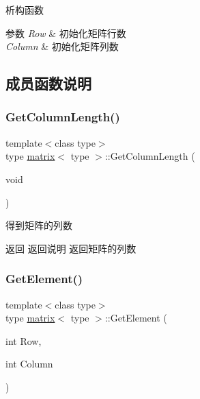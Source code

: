 析构函数 


\begin{DoxyParams}{参数}
{\em Row} & 初始化矩阵行数 \\
\hline
{\em Column} & 初始化矩阵列数 \\
\hline
\end{DoxyParams}


\subsection{成员函数说明}
\mbox{\label{classmatrix_aee9fe31d5065ec906cd0ed908cc127a1}} 
\subsubsection{\texorpdfstring{Get\+Column\+Length()}{GetColumnLength()}}
{\footnotesize\ttfamily template$<$class type$>$ \\
type \mbox{\hyperlink{classmatrix}{matrix}}$<$ type $>$\+::Get\+Column\+Length (\begin{DoxyParamCaption}\item[{void}]{ }\end{DoxyParamCaption})\hspace{0.3cm}{\ttfamily [inline]}}



得到矩阵的列数 

\begin{DoxyReturn}{返回}
返回说明 返回矩阵的列数 
\end{DoxyReturn}
\mbox{\label{classmatrix_a24b3678b5a1b638006fc8fe0fd9cc457}} 
\subsubsection{\texorpdfstring{Get\+Element()}{GetElement()}}
{\footnotesize\ttfamily template$<$class type$>$ \\
type \mbox{\hyperlink{classmatrix}{matrix}}$<$ type $>$\+::Get\+Element (\begin{DoxyParamCaption}\item[{int}]{Row,  }\item[{int}]{Column }\end{DoxyParamCaption})\hspace{0.3cm}{\ttfamily [inline]}}




